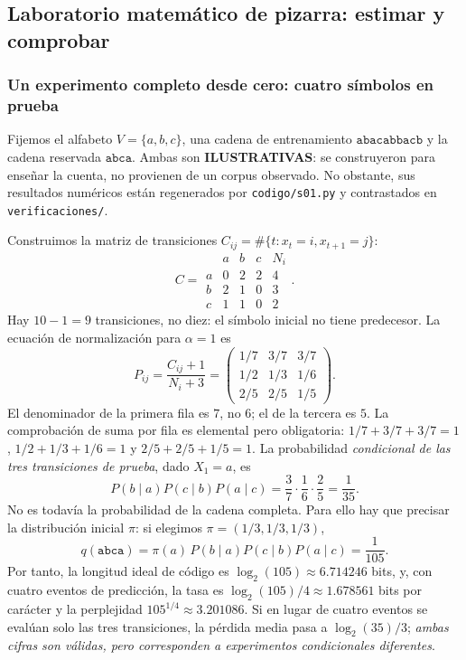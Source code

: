 \subsection{Laboratorio matemático de pizarra: estimar y comprobar}


\subsubsection*{Un experimento completo desde cero: cuatro símbolos en prueba}

Fijemos el alfabeto $V=\{a,b,c\}$, una cadena de entrenamiento
$\texttt{abacabbacb}$ y la cadena reservada $\texttt{abca}$.
Ambas son \textbf{ILUSTRATIVAS}: se construyeron para enseñar la cuenta, no provienen de
un corpus observado. No obstante, sus resultados numéricos están regenerados por
\texttt{codigo/s01.py} y contrastados en \texttt{verificaciones/}.

Construimos la matriz de transiciones $C_{ij}=\#\{t:x_t=i,x_{t+1}=j\}$:
\[
C=\begin{array}{c|rrr|r}&a&b&c&N_i\\\hline
 a&0&2&2&4\\ b&2&1&0&3\\ c&1&1&0&2\end{array}.
\]
Hay $10-1=9$ transiciones, no diez: el símbolo inicial no tiene predecesor.
La ecuación de normalización para $\alpha=1$ es
\[
 P_{ij}=\frac{C_{ij}+1}{N_i+3}
 =\begin{pmatrix}1/7&3/7&3/7\\1/2&1/3&1/6\\2/5&2/5&1/5\end{pmatrix}.
\]
El denominador de la primera fila es $7$, no $6$; el de la tercera es $5$.
La comprobación de suma por fila es elemental pero obligatoria:
$1/7+3/7+3/7=1$, $1/2+1/3+1/6=1$ y $2/5+2/5+1/5=1$.
La probabilidad \emph{condicional de las tres transiciones de prueba}, dado $X_1=a$, es
\[
 P(b\mid a)P(c\mid b)P(a\mid c)
 =\frac37\cdot\frac16\cdot\frac25=\frac1{35}.
\]
No es todavía la probabilidad de la cadena completa. Para ello hay que precisar
la distribución inicial $\pi$: si elegimos $\pi=(1/3,1/3,1/3)$,
\[
 q(\texttt{abca})=\pi(a)\,P(b\mid a)P(c\mid b)P(a\mid c)=\frac1{105}.
\]
Por tanto, la longitud ideal de código es $\log_2(105)\approx6.714246$ bits,
y, con cuatro eventos de predicción, la tasa es
$\log_2(105)/4\approx1.678561$ bits por carácter y la perplejidad
$105^{1/4}\approx3.201086$.
Si en lugar de cuatro eventos se evalúan solo las tres transiciones,
la pérdida media pasa a $\log_2(35)/3$; \emph{ambas cifras son válidas,
pero corresponden a experimentos condicionales diferentes}.

